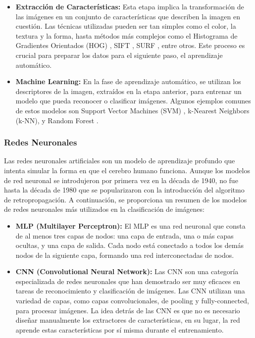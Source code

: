 \documentclass[10pt,a4paper,twocolumn,twoside]{article}
\begin{document}
\begin{itemize}
    \item \textbf{Extracción de Características:} Esta etapa implica la transformación de las imágenes en un conjunto de características que describen la imagen en cuestión. Las técnicas utilizadas pueden ser tan simples como el color, la textura y la forma, hasta métodos más complejos como el Histograma de Gradientes Orientados (HOG) \cite{hog}, SIFT \cite{SIFT}, SURF \cite{SURF}, entre otros. Este proceso es crucial para preparar los datos para el siguiente paso, el aprendizaje automático.
    \item \textbf{Machine Learning:} En la fase de aprendizaje automático, se utilizan los descriptores de la imagen, extraídos en la etapa anterior, para entrenar un modelo que pueda reconocer o clasificar imágenes. Algunos ejemplos comunes de estos modelos son Support Vector Machines (SVM) \cite{svm}, k-Nearest Neighbors (k-NN), y Random Forest \cite{random_forest}.
\end{itemize}

\subsubsection{Redes Neuronales}

Las redes neuronales artificiales son un modelo de aprendizaje profundo que intenta simular la forma en que el cerebro humano funciona. Aunque los modelos de red neuronal se introdujeron por primera vez en la década de 1940, no fue hasta la década de 1980 que se popularizaron con la introducción del algoritmo de retropropagación. A continuación, se proporciona un resumen de los modelos de redes neuronales más utilizados en la clasificación de imágenes:

\begin{itemize}
    \item \textbf{MLP (Multilayer Perceptron):} El MLP es una red neuronal que consta de al menos tres capas de nodos: una capa de entrada, una o más capas ocultas, y una capa de salida. Cada nodo está conectado a todos los demás nodos de la siguiente capa, formando una red interconectadas de nodos.
    \item \textbf{CNN (Convolutional Neural Network):} Las CNN son una categoría especializada de redes neuronales que han demostrado ser muy eficaces en tareas de reconocimiento y clasificación de imágenes. Las CNN utilizan una variedad de capas, como capas convolucionales, de pooling y fully-connected, para procesar imágenes. La idea detrás de las CNN es que no es necesario diseñar manualmente los extractores de características, en su lugar, la red aprende estas características por sí misma durante el entrenamiento. 
  \end{itemize}
\end{document}
